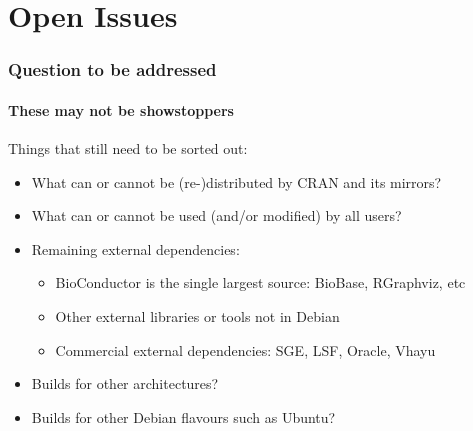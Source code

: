 \documentclass[smaller,compress]{beamer}
\begin{document}
\section{Open Issues}
\begin{frame}
  \frametitle{Question to be addressed}
  \framesubtitle{These may not be showstoppers}

  Things that still need to be sorted out:
  \begin{itemize}
  \item What can or cannot be (re-)distributed by CRAN and its mirrors?
  \item What can or cannot be used (and/or modified) by all users?
  \item Remaining external dependencies: 
    \begin{itemize}
      \item BioConductor is the single largest source: BioBase, RGraphviz, etc
      \item Other external libraries or tools not in Debian 
      \item Commercial external dependencies: SGE, LSF, Oracle, Vhayu
    \end{itemize}
  \item Builds for other architectures?
  \item Builds for other Debian flavours such as Ubuntu?
  \end{itemize}
\end{frame}
\end{document}
